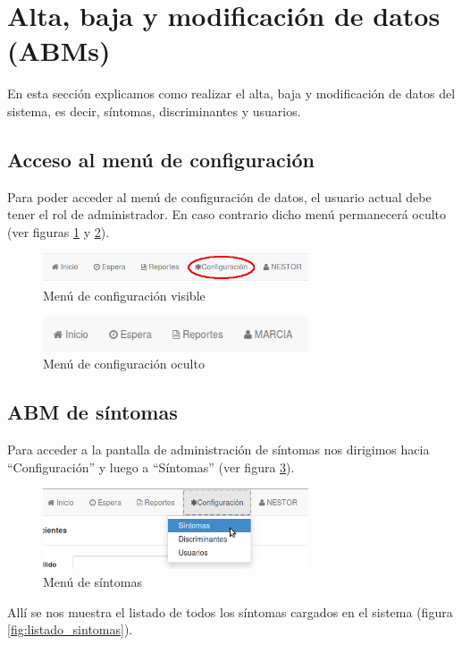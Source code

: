 \section{Alta, baja y modificación de datos (ABMs)}
En esta sección explicamos como realizar el alta, baja y modificación de datos del sistema, es decir, síntomas, discriminantes y usuarios.

\subsection{Acceso al menú de configuración}
Para poder acceder al menú de configuración de datos, el usuario actual debe tener el rol de administrador. En caso contrario dicho menú permanecerá oculto (ver figuras \ref{fig:menu_conf_visible} y \ref{fig:menu_conf_oculto}).

\begin{figure}
\centerline{\includegraphics[width=0.7\textwidth]{menu_configuracion_visible.png}}
\caption{Menú de configuración visible}
\label{fig:menu_conf_visible}
\end{figure}

\begin{figure}
\centerline{\includegraphics[width=0.7\textwidth]{menu_configuracion_oculto.png}}
\caption{Menú de configuración oculto}
\label{fig:menu_conf_oculto}
\end{figure}

\subsection{ABM de síntomas}
Para acceder a la pantalla de administración de síntomas nos dirigimos hacia ``Configuración'' y luego a ``Síntomas'' (ver figura \ref{fig:menu_sintomas}).
\begin{figure}
\centerline{\includegraphics[width=0.7\textwidth]{menu_sintomas.png}}
\caption{Menú de síntomas}
\label{fig:menu_sintomas}
\end{figure}
Allí se nos muestra el listado de todos los síntomas cargados en el sistema (figura \ref{fig:listado_sintomas}).

